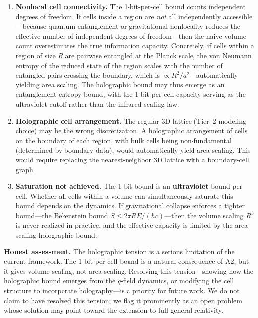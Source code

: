 \documentclass[aps,prd,twocolumn,showpacs,superscriptaddress,preprintnumbers]{revtex4-2}
\begin{document}
\begin{enumerate}
    \item \textbf{Nonlocal cell connectivity.} The 1-bit-per-cell bound counts independent degrees of freedom. If cells inside a region are \emph{not} all independently accessible---because quantum entanglement or gravitational nonlocality reduces the effective number of independent degrees of freedom---then the naive volume count overestimates the true information capacity. Concretely, if cells within a region of size $R$ are pairwise entangled at the Planck scale, the von Neumann entropy of the reduced state of the region scales with the number of entangled pairs crossing the boundary, which is $\propto R^2/a^2$---automatically yielding area scaling. The holographic bound may thus emerge as an entanglement entropy bound, with the 1-bit-per-cell capacity serving as the ultraviolet cutoff rather than the infrared scaling law.

    \item \textbf{Holographic cell arrangement.} The regular 3D lattice (Tier~2 modeling choice) may be the wrong discretization. A holographic arrangement of cells on the boundary of each region, with bulk cells being non-fundamental (determined by boundary data), would automatically yield area scaling. This would require replacing the nearest-neighbor 3D lattice with a boundary-cell graph.

    \item \textbf{Saturation not achieved.} The 1-bit bound is an \textbf{ultraviolet} bound per cell. Whether all cells within a volume can simultaneously saturate this bound depends on the dynamics. If gravitational collapse enforces a tighter bound---the Bekenstein bound $S\leq 2\pi RE/(\hbar c)$---then the volume scaling $R^3$ is never realized in practice, and the effective capacity is limited by the area-scaling holographic bound.
\end{enumerate}

\textbf{Honest assessment.}
The holographic tension is a serious limitation of the current framework.
The 1-bit-per-cell bound is a natural consequence of A2, but it gives volume scaling, not area scaling.
Resolving this tension---showing how the holographic bound emerges from the $q$-field dynamics, or modifying the cell structure to incorporate holography---is a priority for future work.
We do not claim to have resolved this tension; we flag it prominently as an open problem whose solution may point toward the extension to full general relativity.
\end{document}

